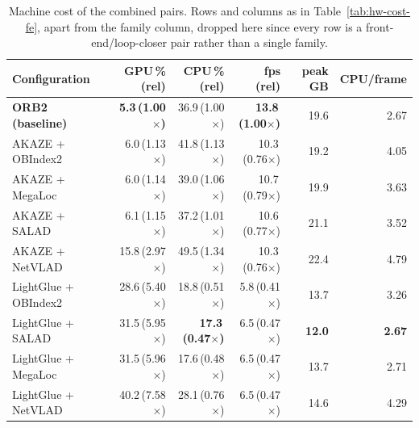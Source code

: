 \begin{table}[H]
\centering
\caption{Machine cost of the combined pairs. Rows and columns as in Table~\ref{tab:hw-cost-fe}, apart from the family column, dropped here since every row is a front-end/loop-closer pair rather than a single family.}
\label{tab:hw-cost-combined}
\footnotesize
\setlength{\tabcolsep}{4pt}
\begin{tabular}{@{}lrrrrr@{}}
\toprule
\textbf{Configuration} & \textbf{GPU\,\% (rel)} & \textbf{CPU\,\% (rel)} & \textbf{fps (rel)} & \textbf{peak GB} & \textbf{CPU/frame} \\
\midrule
\textbf{ORB2 (baseline)} & \textbf{5.3\,(1.00$\times$)} & 36.9\,(1.00$\times$) & \textbf{13.8\,(1.00$\times$)} & 19.6 & 2.67 \\
AKAZE + OBIndex2 & 6.0\,(1.13$\times$) & 41.8\,(1.13$\times$) & 10.3\,(0.76$\times$) & 19.2 & 4.05 \\
AKAZE + MegaLoc & 6.0\,(1.14$\times$) & 39.0\,(1.06$\times$) & 10.7\,(0.79$\times$) & 19.9 & 3.63 \\
AKAZE + SALAD & 6.1\,(1.15$\times$) & 37.2\,(1.01$\times$) & 10.6\,(0.77$\times$) & 21.1 & 3.52 \\
AKAZE + NetVLAD & 15.8\,(2.97$\times$) & 49.5\,(1.34$\times$) & 10.3\,(0.76$\times$) & 22.4 & 4.79 \\
LightGlue + OBIndex2 & 28.6\,(5.40$\times$) & 18.8\,(0.51$\times$) & 5.8\,(0.41$\times$) & 13.7 & 3.26 \\
LightGlue + SALAD & 31.5\,(5.95$\times$) & \textbf{17.3\,(0.47$\times$)} & 6.5\,(0.47$\times$) & \textbf{12.0} & \textbf{2.67} \\
LightGlue + MegaLoc & 31.5\,(5.96$\times$) & 17.6\,(0.48$\times$) & 6.5\,(0.47$\times$) & 13.7 & 2.71 \\
LightGlue + NetVLAD & 40.2\,(7.58$\times$) & 28.1\,(0.76$\times$) & 6.5\,(0.47$\times$) & 14.6 & 4.29 \\
\bottomrule
\end{tabular}
\end{table}
